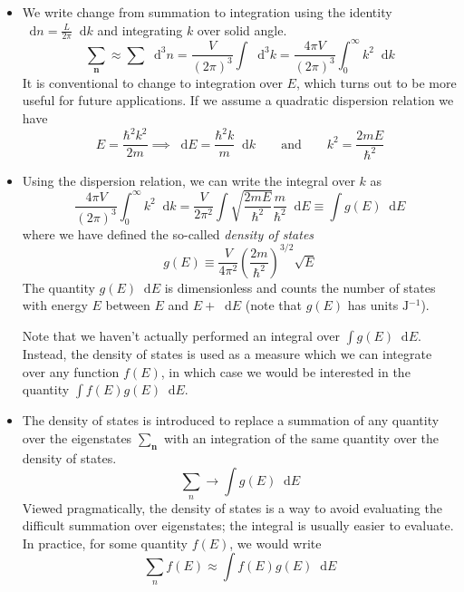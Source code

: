 \documentclass[11pt, a4paper]{article}
\newcommand{\diff}{\mathop{}\!\mathrm{d}} %
\begin{document}
\begin{itemize}
	\item We write change from summation to integration using the identity $ \diff n = \frac{L}{2\pi} \diff k $ and integrating $ k $ over solid angle.
	\begin{equation*}
		\sum_{\bm{n}} \approx \sum \diff^{3}n = \frac{V}{(2\pi)^{3}}\int \diff^{3} k = \frac{4\pi V}{(2\pi)^{3}}\int_{0}^{\infty}k^{2} \diff k
	\end{equation*}
	It is conventional to change to integration over $ E $, which turns out to be more useful for future applications. If we assume a quadratic dispersion relation we have
	\begin{equation*}
		E = \frac{\hbar^{2}k^{2}}{2m} \implies \diff E = \frac{\hbar^{2}k}{m}\diff k \qquad \text{and} \qquad k^{2} = \frac{2mE}{\hbar^{2}}
	\end{equation*}
	
	\item Using the dispersion relation, we can write the integral over $ k $ as
	\begin{equation*}
		\frac{4\pi V}{(2\pi)^{3}}\int_{0}^{\infty}k^{2} \diff k = \frac{V}{2\pi^{2}} \int \sqrt{\frac{2mE}{\hbar^{2}}} \frac{m}{\hbar^{2}} \diff E \equiv \int g(E) \diff E
	\end{equation*}
	where we have defined the so-called \textit{density of states}
	\begin{equation*}
		g(E) \equiv \frac{V}{4\pi^{2}} \left(\frac{2m}{\hbar^{2}}\right)^{3/2} \sqrt{E}
	\end{equation*}
	The quantity $ g(E)\diff E $ is dimensionless and counts the number of states with energy $ E $ between $ E $ and $ E + \diff E $ (note that $ g(E) $ has units $ \si{\joule^{-1}} $). 	
	
	Note that we haven't actually performed an integral over $ \int g(E) \diff E $. Instead, the density of states is used as a measure which we can integrate over any function $ f(E) $, in which case we would be interested in the quantity $ \int f(E) g(E) \diff E $. 
	
	\item The density of states is introduced to replace a summation of any quantity over the eigenstates $ \sum_{\bm{n}} $ with an integration of the same quantity over the density of states. 
	\begin{equation*}
		\sum_{n} \to \int g(E) \diff E 
	\end{equation*}
	Viewed pragmatically, the density of states is a way to avoid evaluating the difficult summation over eigenstates; the integral is usually easier to evaluate. In practice, for some quantity $ f(E) $, we would write
	\begin{equation*}
		\sum_{n} f(E) \approx \int f(E) g(E) \diff E 
	\end{equation*}


\end{itemize}
\end{document}
